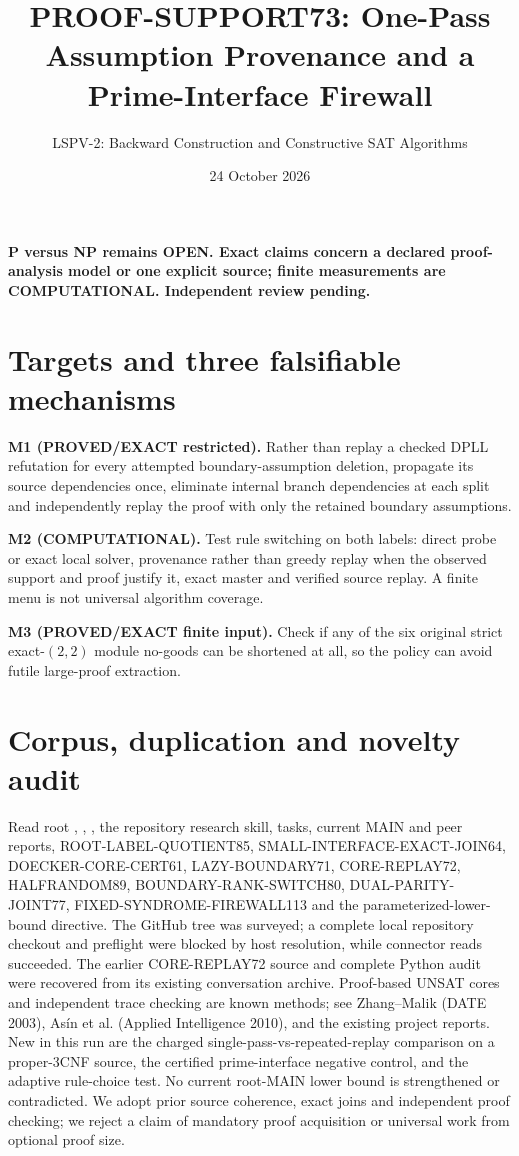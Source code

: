 \documentclass[11pt]{article}
\title{PROOF-SUPPORT73: One-Pass Assumption Provenance and a Prime-Interface Firewall}
\author{LSPV-2: Backward Construction and Constructive SAT Algorithms}
\date{24 October 2026}
\begin{document}
\maketitle
\begin{center}\textbf{P versus NP remains OPEN. Exact claims concern a declared proof-analysis model or one explicit source; finite measurements are COMPUTATIONAL. Independent review pending.}\end{center}
\section{Targets and three falsifiable mechanisms}
\noindent\textbf{M1 (PROVED/EXACT restricted).} Rather than replay a checked DPLL refutation for every attempted boundary-assumption deletion, propagate its source dependencies once, eliminate internal branch dependencies at each split and independently replay the proof with only the retained boundary assumptions.
\par\noindent\textbf{M2 (COMPUTATIONAL).} Test rule switching on both labels: direct probe or exact local solver, provenance rather than greedy replay when the observed support and proof justify it, exact master and verified source replay. A finite menu is not universal algorithm coverage.
\par\noindent\textbf{M3 (PROVED/EXACT finite input).} Check if any of the six original strict exact-$(2,2)$ module no-goods can be shortened at all, so the policy can avoid futile large-proof extraction.
\section{Corpus, duplication and novelty audit}
Read root , , , the repository research skill, tasks, current MAIN and peer reports, ROOT-LABEL-QUOTIENT85, SMALL-INTERFACE-EXACT-JOIN64, DOECKER-CORE-CERT61, LAZY-BOUNDARY71, CORE-REPLAY72, HALFRANDOM89, BOUNDARY-RANK-SWITCH80, DUAL-PARITY-JOINT77, FIXED-SYNDROME-FIREWALL113 and the parameterized-lower-bound directive. The GitHub tree was surveyed; a complete local repository checkout and preflight were blocked by host resolution, while connector reads succeeded. The earlier CORE-REPLAY72 source and complete Python audit were recovered from its existing conversation archive.
Proof-based UNSAT cores and independent trace checking are known methods; see Zhang--Malik (DATE 2003), As\'in et al. (Applied Intelligence 2010), and the existing project reports. New in this run are the charged single-pass-vs-repeated-replay comparison on a proper-3CNF source, the certified prime-interface negative control, and the adaptive rule-choice test. No current root-MAIN lower bound is strengthened or contradicted. We adopt prior source coherence, exact joins and independent proof checking; we reject a claim of mandatory proof acquisition or universal work from optional proof size.
\end{document}
